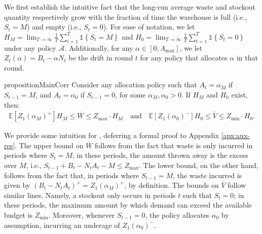 \documentclass[mnsc,nonblindrev]{informs3}
\newcommand{\ind}[1]{\mathds{1}\left\{#1\right\}}
\newcommand{\Exp}[1]{\mathbb{E} \left[ #1 \right]} %
\begin{document}
We first establish the intuitive fact that the long-run average waste and stockout quantity respectively grow with the fraction of time the warehouse is full (i.e., $S_t = M$) and empty (i.e., $S_t = 0$). For ease of notation, we let $H_M = \lim_{T \rightarrow \infty}\frac{1}{T}\sum_{t=1}^T \ind{S_{t} = M}$ and $H_0 = \lim_{T \rightarrow \infty}\frac{1}{T}\sum_{t=1}^T \ind{S_{t} = 0}$ under any policy $\mathcal{A}$. Additionally, for any $\alpha \in [0,A_{\max}]$, we let $Z_t(\alpha) = B_t - \alpha N_t$ be the drift in round $t$ for any policy that allocates $\alpha$ in that round.


\begin{restatable}{proposition}{MainCorr}\label{Cor:Main_expression_for_inefficiency}
Consider any allocation policy such that $A_t = \alpha_M$ if $S_{t-1} = M$, and $A_t = \alpha_0$ if $S_{t-1} = 0$, for some $\alpha_M, \alpha_0 > 0$.  If $H_M$ and $H_0$ exist, then:
\begin{align*}
{\Exp{Z_1(\alpha_M)^+} H_M \leq \overline{W} \leq Z_{\max} \cdot H_M \quad \text{and} \quad \Exp{Z_1(\alpha_0)^-} H_0 \leq \overline{V} \leq Z_{\min} \cdot H_0.}
\end{align*}
\end{restatable}
We provide some intuition for , deferring a formal proof to Appendix \ref{apx:aux-res}. The upper bound on $\overline{W}$ follows from the fact that waste is only incurred in periods where $S_t = M$; in these periods, the amount thrown away is the excess over $M$, i.e., $S_{t-1}+B_t-N_tA_t-M \leq Z_{\max}$. The lower bound, on the other hand, follows from the fact that, in periods where $S_{t-1} = M$, the waste incurred is given by $(B_t-N_tA_t)^+ = Z_1(\alpha_M)^+$, by definition. The bounds on $\overline{V}$ follow similar lines. Namely, a stockout only occurs in periods $t$ such that $S_t = 0$; in these periods, the maximum amount by which demand can exceed the available budget is $Z_{\min}$. Moreover, whenever $S_{t-1} = 0$, the policy allocates $\alpha_0$ by assumption, incurring an underage of $Z_1(\alpha_0)^-$.
\end{document}
